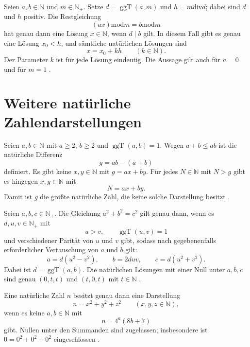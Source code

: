 \begin{theorem}
\label{b10guide:thm:linear-remainder-equation}
Seien $a,b\in\mathbb N$ und $m\in\mathbb N_+$.
Setze $d=\operatorname{ggT}(a,m)$ und
$h=m\mathbin{\mathrm{div}}d$; dabei sind $d$ und $h$ positiv.
Die Restgleichung
\[
 (ax)\mathbin{\mathrm{mod}}m=b\mathbin{\mathrm{mod}}m
\]
hat genau dann eine Lösung $x\in\mathbb N$, wenn $d\mid b$ gilt.
In diesem Fall gibt es genau eine Lösung $x_0<h$, und sämtliche
natürlichen Lösungen sind
\[
 x=x_0+kh\qquad(k\in\mathbb N).
\]
Der Parameter $k$ ist für jede Lösung eindeutig.
Die Aussage gilt auch für $a=0$ und für $m=1$ \cite{natlinearrest}.
\end{theorem}

\section{Weitere natürliche Zahlendarstellungen}

\begin{theorem}
\label{b10guide:thm:frobenius-two-generators}
Seien $a,b\in\mathbb N$ mit $a\ge2$, $b\ge2$ und
$\operatorname{ggT}(a,b)=1$.
Wegen $a+b\le ab$ ist die natürliche Differenz
\[
 g=ab-(a+b)
\]
definiert. Es gibt keine $x,y\in\mathbb N$ mit $g=ax+by$.
Für jedes $N\in\mathbb N$ mit $N>g$ gibt es hingegen
$x,y\in\mathbb N$ mit
\[
 N=ax+by.
\]
Damit ist $g$ die größte natürliche Zahl, die keine solche Darstellung
besitzt \cite{natfrobenius}.
\end{theorem}

\begin{theorem}
\label{b10guide:thm:pythagorean-triples}
Seien $a,b,c\in\mathbb N_+$.
Die Gleichung $a^2+b^2=c^2$ gilt genau dann, wenn es
$d,u,v\in\mathbb N_+$ mit
\[
 u>v,\qquad \operatorname{ggT}(u,v)=1
\]
und verschiedener Parität von $u$ und $v$ gibt, sodass nach
gegebenenfalls erforderlicher Vertauschung von $a$ und $b$ gilt:
\[
 a=d(u^2-v^2),\qquad b=2duv,\qquad c=d(u^2+v^2).
\]
Dabei ist $d=\operatorname{ggT}(a,b)$.
Die natürlichen Lösungen mit einer Null unter $a,b,c$ sind genau
$(0,t,t)$ und $(t,0,t)$ mit $t\in\mathbb N$ \cite{natpythagoras}.
\end{theorem}

\begin{theorem}
\label{b10guide:thm:three-squares}
Eine natürliche Zahl $n$ besitzt genau dann eine Darstellung
\[
 n=x^2+y^2+z^2\qquad(x,y,z\in\mathbb N),
\]
wenn es keine $a,b\in\mathbb N$ mit
\[
 n=4^a(8b+7)
\]
gibt. Nullen unter den Summanden sind zugelassen; insbesondere
ist $0=0^2+0^2+0^2$ eingeschlossen \cite{natthreesquares}.
\end{theorem}


